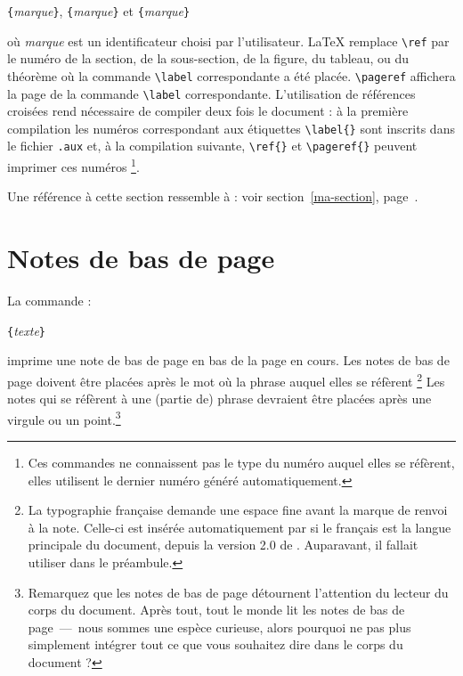 \begin{lscommand}
\verb|{|\emph{marque}\verb|}|, \verb|{|\emph{marque}\verb|}|
et \verb|{|\emph{marque}\verb|}|
\end{lscommand}
\noindent où \emph{marque} est un identificateur choisi par
l'utilisateur. \LaTeX{} remplace \verb|\ref| par le numéro de la
section, de la sous-section, de la figure, du tableau, ou du théorème
où la commande \verb|\label| correspondante a été
placée. \verb|\pageref| affichera la page de la commande \verb|\label|
correspondante.
L'utilisation de références croisées rend nécessaire de compiler deux fois le
document : à la première compilation les numéros correspondant aux étiquettes
\verb|\label{}| sont inscrits dans le fichier \texttt{.aux} et, à la
compilation suivante, \verb|\ref{}| et \verb|\pageref{}| peuvent imprimer
ces numéros%
\footnote{Ces commandes ne connaissent pas le type du numéro auquel
elles se réfèrent, elles utilisent le dernier numéro généré
automatiquement.}.

\begin{example}
Une référence à cette
section\label{ma-section}
ressemble à :
\og voir section~\ref{ma-section},
page~\pageref{ma-section}.\fg
\end{example}

\section{Notes de bas de page}
La commande :
\begin{lscommand}
\verb|{|\emph{texte}\verb|}|
\end{lscommand}
\noindent imprime une note de bas de page en bas de la page en cours.
Les notes de bas de page doivent être placées après le mot où la
phrase auquel elles se réfèrent%
\footnote{La typographie française demande une espace fine avant la
marque de renvoi à la note. Celle-ci est insérée automatiquement par
 si le français est la langue principale du document, depuis la
version 2.0 de . Auparavant, il fallait utiliser
 dans le préambule. \NdT}
Les notes qui se réfèrent à une (partie de) phrase devraient être
placées après une virgule ou un point.\footnote{Remarquez que les
  notes de bas de page détournent l'attention du lecteur du corps du
  document. Après tout, tout le monde lit les notes de bas de
  page~---~nous sommes une espèce curieuse, alors pourquoi ne pas plus
  simplement intégrer tout ce que vous souhaitez dire dans le corps du
  document ?\footnotemark}
\nopagebreak[2]

